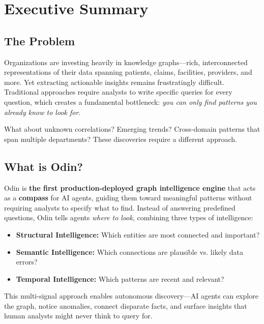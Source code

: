 \documentclass[11pt]{article}
\begin{document}
\tableofcontents
\newpage

\section{Executive Summary}

\subsection{The Problem}

Organizations are investing heavily in knowledge graphs—rich, interconnected representations of their data spanning patients, claims, facilities, providers, and more. Yet extracting actionable insights remains frustratingly difficult. Traditional approaches require analysts to write specific queries for every question, which creates a fundamental bottleneck: \textit{you can only find patterns you already know to look for.}

What about unknown correlations? Emerging trends? Cross-domain patterns that span multiple departments? These discoveries require a different approach.

\subsection{What is Odin?}

Odin is \textbf{the first production-deployed graph intelligence engine} that acts as a \textbf{compass} for AI agents, guiding them toward meaningful patterns without requiring analysts to specify what to find. Instead of answering predefined questions, Odin tells agents \textit{where to look}, combining three types of intelligence:

\begin{itemize}
\item \textbf{Structural Intelligence:} Which entities are most connected and important?
\item \textbf{Semantic Intelligence:} Which connections are plausible vs. likely data errors?
\item \textbf{Temporal Intelligence:} Which patterns are recent and relevant?
\end{itemize}

This multi-signal approach enables autonomous discovery—AI agents can explore the graph, notice anomalies, connect disparate facts, and surface insights that human analysts might never think to query for.
\end{document}
